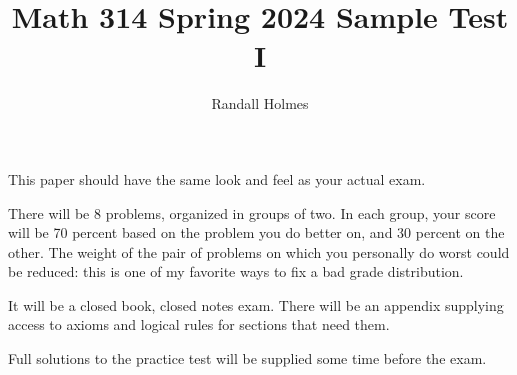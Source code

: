 \documentclass[12pt]{article}
\title{Math 314 Spring 2024 Sample Test I}
\author{Randall Holmes}
\begin{document}
\maketitle

This paper should have the same look and feel as your actual exam.

There will be 8 problems, organized in groups of two.  In each group, your score will be 70 percent based on the problem you do better on, and 30 percent on the other.
The weight of the pair of problems on which you personally do worst could be reduced:  this is one of my favorite ways to fix a bad grade distribution.

It will be a closed book, closed notes exam.  There will be an appendix supplying access to axioms and logical rules for sections that need them.

Full solutions to the practice test will be supplied some time before the exam.
\end{document}
